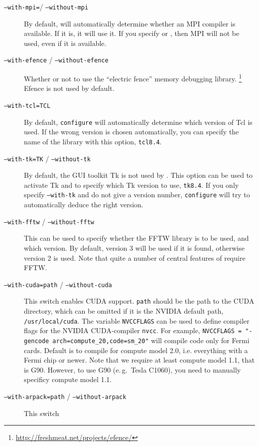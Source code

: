 \begin{description}
\item[\texttt{--with-mpi=}/ \texttt{--without-mpi}] By default,
   will automatically determine whether an MPI
  compiler is available.  If it is, it will use it.  If you specify
   or , then MPI will
  not be used, even if it is available.
\item[\texttt{--with-efence} / \texttt{--without-efence}] Whether or
  not to use the ``electric fence'' memory debugging library.
  \footnote{\url{http://freshmeat.net/projects/efence/}} Efence is not
  used by default.
\item[\texttt{--with-tcl=TCL}] By default, \texttt{configure} will
  automatically determine which version of Tcl is used.  If the wrong
  version is chosen automatically, you can specify the name of the
  library with this option, \eg \texttt{tcl8.4}.
\item[\texttt{--with-tk=TK} / \texttt{--without-tk}] By default, the
  GUI toolkit Tk is not used by \es. This option can be used to
  activate Tk and to specify which Tk version to use, \eg{}
  \texttt{tk8.4}. If you only specify \texttt{--with-tk} and do not
  give a version number, \texttt{configure} will try to automatically
  deduce the right version.
\item[\texttt{--with-fftw} / \texttt{--without-fftw}] This can
  be used to specify whether the FFTW library is to be used, and which
  version.  By default, version 3 will be used if it is found,
  otherwise version 2 is used.  Note that quite a number of central
  features of \es require FFTW.
\item[\texttt{--with-cuda=path} / \texttt{--without-cuda}] This switch
  enables CUDA support. \texttt{path} should be the path to the CUDA
  directory, which can be omitted if it is the NVIDIA default path,
  \ie \texttt{/usr/local/cuda}. The variable \texttt{NVCCFLAGS} can
  be used to define compiler flags for the NVIDIA CUDA-compiler
  \texttt{nvcc}. For example, \texttt{NVCCFLAGS = "{}-gencode
    arch=compute_20,code=sm_20"{}} will compile code only for Fermi
  cards.  Default is to compile for compute model 2.0,
  i.e. everything with a Fermi chip or newer.  Note that we require at
  least compute model 1.1, that is G90. However, to use G90 (e.\,g.~Tesla
  C1060), you need to manually specificy compute model 1.1.
\item[\texttt{--with-arpack=path} / \texttt{--without-arpack}] This switch

\end{description}
